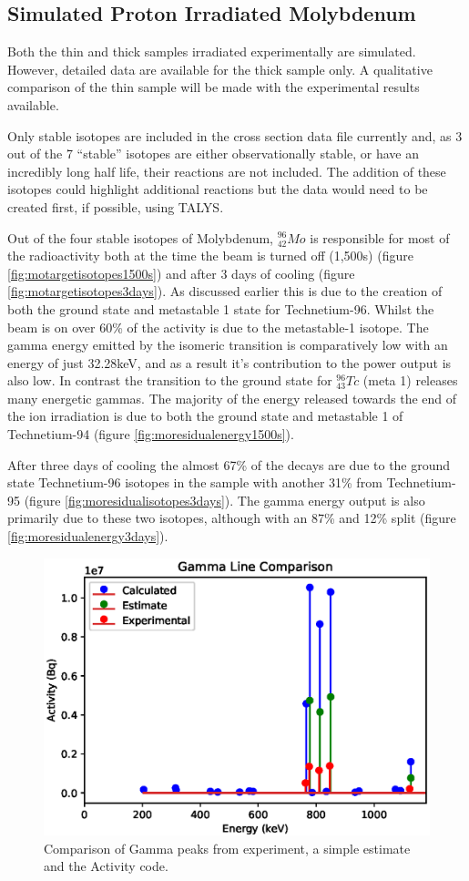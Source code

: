 \subsection{Simulated Proton Irradiated Molybdenum}

Both the thin and thick samples irradiated experimentally are simulated.  However, detailed data are available for the thick sample only.  A qualitative comparison of the thin sample will be made with the experimental results available.

Only stable isotopes are included in the cross section data file currently and, as 3 out of the 7 ``stable'' isotopes are either observationally stable, or have an incredibly long half life, their reactions are not included.  The addition of these isotopes could highlight additional reactions but the data would need to be created first, if possible, using TALYS.

Out of the four stable isotopes of Molybdenum, ${}^{96}_{42}Mo$ is responsible for most of the radioactivity both at the time the beam is turned off (1,500s) (figure \ref{fig:motargetisotopes1500s}) and after 3 days of cooling (figure \ref{fig:motargetisotopes3days}).  As discussed earlier this is due to the creation of both the ground state and metastable 1 state for Technetium-96.  Whilst the beam is on over 60\% of the activity is due to the metastable-1 isotope.  The gamma energy emitted by the isomeric transition is comparatively low with an energy of just 32.28keV, and as a result it's contribution to the power output is also low.  In contrast the transition to the ground state for ${}^{96}_{43}Tc$ (meta 1) releases many energetic gammas.  The majority of the energy released towards the end of the ion irradiation is due to both the ground state and metastable 1 of Technetium-94 (figure \ref{fig:moresidualenergy1500s}).

After three days of cooling the almost 67\% of the decays are due to the ground state Technetium-96 isotopes in the sample with another 31\% from Technetium-95 (figure \ref{fig:moresidualisotopes3days}).  The gamma energy output is also primarily due to these two isotopes, although with an 87\% and 12\% split (figure \ref{fig:moresidualenergy3days}). 

\begin{figure}[htb]
\centering
\includegraphics[width=0.5\linewidth]{chapters/activity_code/mo-john-hewett/thick/plot_gammas/gammas.eps}
\caption{Comparison of Gamma peaks from experiment, a simple estimate and the Activity code.}
\label{fig:mogammacomparison}
\end{figure}

